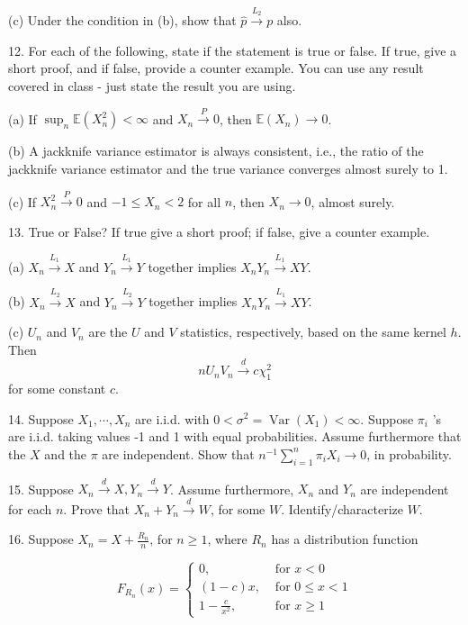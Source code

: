 \documentclass[11pt]{article}
\theoremstyle{definition}
\begin{document}
(c) Under the condition in (b), show that $\widehat{p} \xrightarrow{L_2} p$ also.

12. For each of the following, state if the statement is true or false. If true, give a short proof, and if false, provide a counter example. You can use any result covered in class - just state the result you are using.

(a) If $\sup _n \mathbb{E}\left(X_n^2\right)<\infty$ and $X_n \xrightarrow{P} 0$, then $\mathbb{E}\left(X_n\right) \rightarrow 0$.

(b) A jackknife variance estimator is always consistent, i.e., the ratio of the jackknife variance estimator and the true variance converges almost surely to 1.

(c) If $X_n^2 \xrightarrow{P} 0$ and $-1 \leq X_n<2$ for all $n$, then $X_n \rightarrow 0$, almost surely.

13. True or False? If true give a short proof; if false, give a counter example.

(a) $X_n \xrightarrow{L_1} X$ and $Y_n \xrightarrow{L_1} Y$ together implies $X_n Y_n \xrightarrow{L_1} X Y$.

(b) $X_n \xrightarrow{L_2} X$ and $Y_n \xrightarrow{L_2} Y$ together implies $X_n Y_n \xrightarrow{L_1} X Y$.

(c) $U_n$ and $V_n$ are the $U$ and $V$ statistics, respectively, based on the same kernel $h$. Then
$$
n U_n V_n \xrightarrow{d} c \chi_1^2
$$
for some constant $c$.

14. Suppose $X_1, \cdots, X_n$ are i.i.d. with $0<\sigma^2=\operatorname{Var}\left(X_1\right)<\infty$. Suppose $\pi_i$ 's are i.i.d. taking values -1 and 1 with equal probabilities. Assume furthermore that the $X$ and the $\pi$ are independent. Show that $n^{-1} \sum_{i=1}^n \pi_i X_i \rightarrow 0$, in probability.

15. Suppose $X_n \xrightarrow{d} X, Y_n \xrightarrow{d} Y$. Assume furthermore, $X_n$ and $Y_n$ are independent for each $n$. Prove that $X_n+Y_n \xrightarrow{d} W$, for some $W$. Identify/characterize $W$.

16. Suppose $X_n=X+\frac{R_n}{n}$, for $n \geq 1$, where $R_n$ has a distribution function

$$
F_{R_n}(x)= \begin{cases}0, & \text { for } x<0 \\ (1-c) x, & \text { for } 0 \leq x<1 \\ 1-\frac{c}{x^2}, & \text { for } x \geq 1\end{cases}
$$
\end{document}
